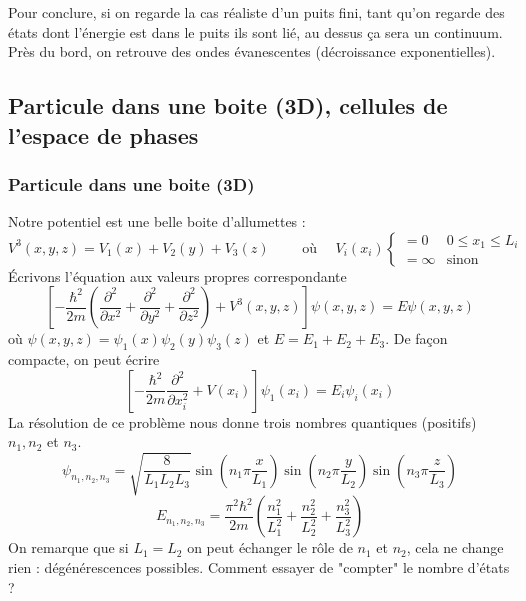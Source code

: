		Pour conclure, si on regarde la cas réaliste d'un puits fini, tant qu'on regarde 
		des états dont l'énergie est dans le puits ils sont lié, au dessus ça sera un 
		continuum. Près du bord, on retrouve des ondes évanescentes (décroissance exponentielles). 


	\subsection{Particule dans une boite (3D), cellules de l'espace de phases}
		\subsubsection{Particule dans une boite (3D)}	
		Notre potentiel est une belle boite d'allumettes :
		\begin{equation}
		V^3(x,y,z) = V_1(x) + V_2(y)+V_3(z)\qquad\text{ où }\quad V_i(x_i) \left\{\begin{array}{ll}
		=0 & 0\leq x_1\leq L_i\\
		=\infty & \text{sinon}
		\end{array}\right.
		\end{equation}				
		Écrivons l'équation aux valeurs propres correspondante
		\begin{equation}
		\left[-\frac{\hbar^2}{2m}\left(\dfrac{\partial^2}{\partial x^2}+\dfrac{\partial^2}{\partial y^2}+
		\dfrac{\partial^2}{\partial z^2}\right)+V^3(x,y,z)\right]\psi(x,y,z) = E\psi(x,y,z)
		\end{equation}
		où $\psi(x,y,z) = \psi_1(x)\psi_2(y)\psi_3(z)$ et $E=E_1+E_2+E_3$. De façon compacte, on peut écrire
		\begin{equation}
		\left[-\frac{\hbar^2}{2m}\dfrac{\partial^2}{\partial x_i^2}+V(x_i)\right]\psi_1(x_i) = E_i\psi_i(x_i)
		\end{equation}
		La résolution de ce problème nous donne trois nombres quantiques (positifs) $n_1,n_2$ et $n_3$.
		\begin{equation}
		\psi_{n_1,n_2,n_3} = \sqrt{\dfrac{8}{L_1L_2L_3}}\sin\left(n_1\pi\frac{x}{L_1}\right)
		\sin\left(n_2\pi\frac{y}{L_2}\right)\sin\left(n_3\pi\frac{z}{L_3}\right)
		\end{equation}				
		\begin{equation}
		E_{n_1,n_2,n_3} = \dfrac{\pi^2\hbar^2}{2m}\left(\dfrac{n_1^2}{L_1^2}+\dfrac{n_2^2}{L_2^2}+
		\dfrac{n_3^2}{L_3^2}\right)
		\end{equation}
		On remarque que si $L_1=L_2$ on peut échanger le rôle de $n_1$ et $n_2$, 	cela ne change rien :
		dégénérescences possibles. Comment essayer de "compter" le nombre d'états ?
		
